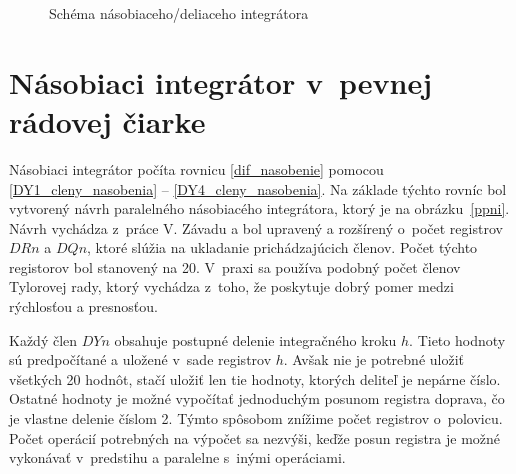\begin{figure}[h]
\centering
{}
\caption{Schéma násobiaceho/deliaceho integrátora}
\label{schema_ndi}
\end{figure}


\section{Násobiaci integrátor v~pevnej rádovej čiarke}
Násobiaci integrátor počíta rovnicu \eqref{dif_nasobenie} pomocou \eqref{DY1_cleny_nasobenia} -- \eqref{DY4_cleny_nasobenia}. Na základe týchto rovníc bol vytvorený návrh paralelného násobiacého integrátora, ktorý je na obrázku~\ref{ppni}. Návrh vychádza z~práce V. Závadu \cite{ZavadaBP} a bol upravený a rozšírený o~počet registrov $ DRn $ a $ DQn $, ktoré slúžia na ukladanie prichádzajúcich členov. Počet týchto registorov bol stanovený na 20. V~praxi sa používa podobný počet členov Tylorovej rady, ktorý vychádza z~toho, že poskytuje dobrý pomer medzi rýchlosťou a presnosťou.

Každý člen $ DYn $ obsahuje postupné delenie integračného kroku $ h $. Tieto hodnoty sú predpočítané a uložené v~sade registrov $ h $. Avšak nie je potrebné uložiť všetkých 20 hodnôt, stačí uložiť len tie hodnoty, ktorých deliteľ je nepárne číslo. Ostatné hodnoty je možné vypočítať jednoduchým posunom registra doprava, čo je vlastne delenie číslom 2. Týmto spôsobom znížime počet registrov o~polovicu. Počet operácií potrebných na výpočet sa nezvýši, keďže posun registra je možné vykonávať v~predstihu a paralelne s~inými operáciami.

